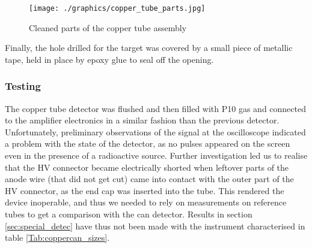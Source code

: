 \begin{figure}[htb!]
  \centering
  \texttt{[image: ./graphics/copper\_tube\_parts.jpg]}
  \caption{Cleaned parts of the copper tube assembly}
  \label{fig:copper_parts}
\end{figure}

Finally, the hole drilled for the target was covered by a small piece of metallic tape, held in place by epoxy glue to seal off the opening.

\subsubsection{Testing}

The copper tube detector was flushed and then filled with P10 gas and connected to the amplifier electronics in a similar fashion than the previous detector. Unfortunately, preliminary observations of the signal at the oscilloscope indicated a problem with the state of the detector, as no pulses appeared on the screen even in the presence of a radioactive source. Further investigation led us to realise that the HV connector became electrically shorted when leftover parts of the anode wire (that did not get cut) came into contact with the outer part of the HV connector, as the end cap was inserted into the tube. This rendered the device inoperable, and thus we needed to rely on measurements on reference tubes to get a comparison with the can detector. Results in section \ref{sec:special_detec} have thus not been made with the instrument characterised in table \ref{Tab:coppercan_sizes}.

